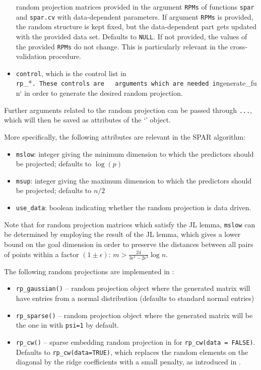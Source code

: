 \documentclass[
  article]{jss}
\newcommand{\class}[1]{`\code{#1}'}
\begin{document}
\begin{itemize}
  random projection matrices provided in the argument \texttt{RPMs} of
  functions \texttt{spar} and \texttt{spar.cv} with data-dependent
  parameters. If argument \texttt{RPMs} is provided, the random
  structure is kept fixed, but the data-dependent part gets updated with
  the provided data set. Defaults to \texttt{NULL}. If not provided, the
  values of the provided \texttt{RPMs} do not change. This is
  particularly relevant in the cross-validation procedure.
\item
  \texttt{control}, which is the control list in
  \texttt{rp}\_*\texttt{.\ These\ controls\ are\ \ \ arguments\ which\ are\ needed\ in}generate\_fun`
  in order to generate the desired random projection.
\end{itemize}

Further arguments related to the random projection can be passed through
\texttt{...}, which will then be saved as attributes of the
\class{randomprojection} object.

More specifically, the following attributes are relevant in the SPAR
algorithm:

\begin{itemize}
\item
  \texttt{mslow}: integer giving the minimum dimension to which the
  predictors should be projected; defaults to \(\log(p)\)
\item
  \texttt{msup}: integer giving the maximum dimension to which the
  predictors should be projected; defaults to \(n/2\)
\item
  \texttt{use\_data}: boolean indicating whether the random projection
  is data driven.
\end{itemize}

Note that for random projection matrices which satisfy the JL lemma,
\texttt{mslow} can be determined by employing the result of the JL
lemma, which gives a lower bound on the goal dimension in order to
preserve the distances between all pairs of points within a factor
\((1 \pm \epsilon)\): \(m>\frac{24}{3\epsilon^2-2\epsilon^3}\log n\).

The following random projections are implemented in :

\begin{itemize}
\item
  \texttt{rp\_gaussian()} -- random projection object where the
  generated matrix will have entries from a normal distribution
  (defaults to standard normal entries)
\item
  \texttt{rp\_sparse()} -- random projection object where the generated
  matrix will be the one in \citep{ACHLIOPTAS2003JL} with \texttt{psi=1}
  by default.
\item
  \texttt{rp\_cw()} -- sparse embedding random projection in
  \citep{Clarkson2013LowRankApprox} for \texttt{rp\_cw(data\ =\ FALSE)}.
  Defaults to \texttt{rp\_cw(data=TRUE)}, which replaces the random
  elements on the diagonal by the ridge coefficients with a small
  penalty, as introduced in \citet{parzer2024glms}.
\end{itemize}
\end{document}

